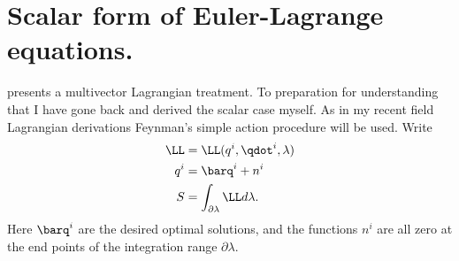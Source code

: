 %
%
\section{Scalar form of Euler-Lagrange equations.}
%
\citep{lasenby1993mda} presents a multivector Lagrangian treatment.  To
preparation for understanding that I have gone
back and derived the scalar
case myself.  As in my recent field Lagrangian derivations Feynman's
\citep{feynman1963flp} simple action procedure will be used.
%
Write
%
\begin{equation}\label{eqn:eulerLagrange:22}
\begin{aligned}
\LL &= \LL(q^i, \qdot^i, \lambda) \\
q^i &= \barq^i + n^i \\
S &= \int_{\partial \lambda} \LL d\lambda.
\end{aligned}
\end{equation}
%
Here \(\barq^i\) are the desired optimal solutions, and the functions \(n^i\)
are all zero at the end points of the integration range \(\partial \lambda\).

